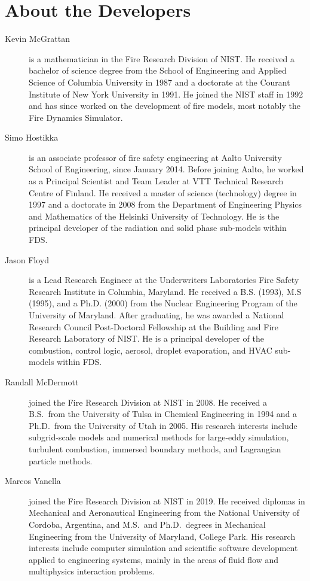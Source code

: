 \chapter{About the Developers}

\begin{description}

\item[Kevin McGrattan] is a mathematician in the Fire Research Division of NIST. He received a bachelor of science degree from the School of Engineering and Applied Science of Columbia University in 1987 and a doctorate at the Courant Institute of New York University in 1991. He joined the NIST staff in 1992 and has since worked on the development of fire models, most notably the Fire Dynamics Simulator.

\item[Simo Hostikka] is an associate professor of fire safety engineering at Aalto University School of Engineering, since January 2014. Before joining Aalto, he worked as a Principal Scientist and Team Leader at VTT Technical Research Centre of Finland. He received a master of science (technology) degree in 1997 and a doctorate in 2008 from the Department of Engineering Physics and Mathematics of the Helsinki University of Technology.  He is the principal developer of the radiation and solid phase sub-models within FDS.

\item[Jason Floyd] is a Lead Research Engineer at the Underwriters Laboratories Fire Safety Research Institute in Columbia, Maryland. He received a B.S. (1993), M.S (1995), and a Ph.D. (2000) from the Nuclear Engineering Program of the University of Maryland. After graduating, he was awarded a National Research Council Post-Doctoral Fellowship at the Building and Fire Research Laboratory of NIST. He is a principal developer of the combustion, control logic, aerosol, droplet evaporation, and HVAC sub-models within FDS.

\item[Randall McDermott] joined the Fire Research Division at NIST in 2008. He received a B.S.~from the University of Tulsa in Chemical Engineering in 1994 and a Ph.D.~from the University of Utah in 2005. His research interests include subgrid-scale models and numerical methods for large-eddy simulation, turbulent combustion, immersed boundary methods, and Lagrangian particle methods.

\item[Marcos Vanella] joined the Fire Research Division at NIST in 2019. He received diplomas in Mechanical and Aeronautical Engineering from the National University of Cordoba, Argentina, and M.S.~and Ph.D.~degrees in Mechanical Engineering from the University of Maryland, College Park. His research interests include computer simulation and scientific software development applied to engineering systems, mainly in the areas of fluid flow and multiphysics interaction problems.


\end{description}
